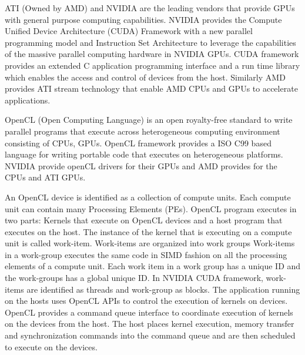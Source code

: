 \documentclass[conference]{IEEEtran}
\begin{document}
ATI (Owned by AMD) and NVIDIA are the leading vendors that provide GPUs with general purpose computing capabilities. NVIDIA provides the Compute Unified Device Architecture (CUDA) Framework with a new parallel programming model and Instruction Set Architecture to leverage the capabilities of the massive parallel computing hardware in NVIDIA GPUs. CUDA framework provides an extended C application programming interface and a run time library which enables the access and control of devices from the host. Similarly AMD provides ATI stream technology that enable AMD CPUs and GPUs to accelerate applications.

OpenCL (Open Computing Language) is an open royalty-free standard to write parallel programs that execute across heterogeneous computing environment consisting of CPUs, GPUs. OpenCL framework provides a ISO C99 based language for writing portable code that executes on heterogeneous platforms. NVIDIA provide openCL drivers for their GPUs and AMD provides for the CPUs and ATI GPUs.

An OpenCL device is identified as a collection of compute units. Each compute unit can contain many Processing Elements (PEs). OpenCL program executes in two parts: Kernels that execute on OpenCL devices and a host program that executes on the host. The instance of the kernel that is executing on a compute unit is called work-item. Work-items are organized into work groups Work-items in a work-group executes the same code in SIMD fashion on all the processing elements of a compute unit. Each work item in a work group has a unique ID and the work-groups has a global unique ID. In NVIDIA CUDA framework, work-items are identified as threads and work-group as blocks. The application running on the hosts uses OpenCL APIs to control the execution of kernels on devices. OpenCL provides a command queue interface to coordinate execution of kernels on the devices from the host. The host places kernel execution, memory transfer and synchronization commands into the command queue and are then scheduled to execute on the devices.
\end{document}
